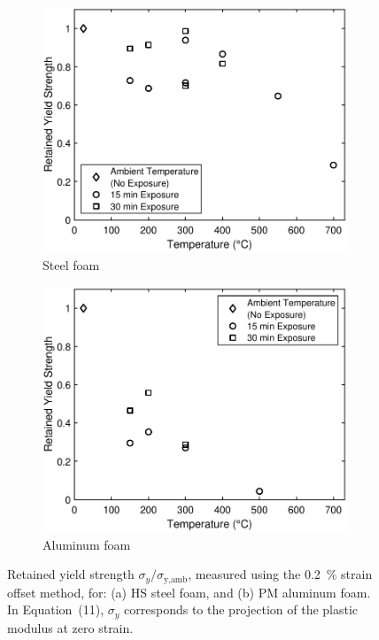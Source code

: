 \documentclass[review]{elsarticle}
\begin{document}
\begin{figure}
	\centering
	\begin{subfigure}{.5\textwidth}
		\centering
		\includegraphics[width=0.95\linewidth]
		{Tex-Figures/Fig13a-yield_stress_Steel.pdf}
		\caption{Steel foam}
		\label{fig3:sub1}
	\end{subfigure}%
	\begin{subfigure}{.5\textwidth}
		\centering
		\includegraphics[width=0.95\linewidth]
		{Tex-Figures/Fig13b-yield_stress_Aluminum.pdf}
		\caption{Aluminum foam}
		\label{fig3:sub2}
	\end{subfigure}
	\caption{Retained yield strength $\sigma_y/\sigma_\text{y,amb}$, measured using the 0.2~\% strain offset method, for: (a) HS steel foam, and (b) PM aluminum foam. In Equation~(11), $\sigma_y$ corresponds to the projection of the plastic modulus at zero strain.}
	\label{Quasi-elastic_modulus}
\end{figure}
\end{document}
